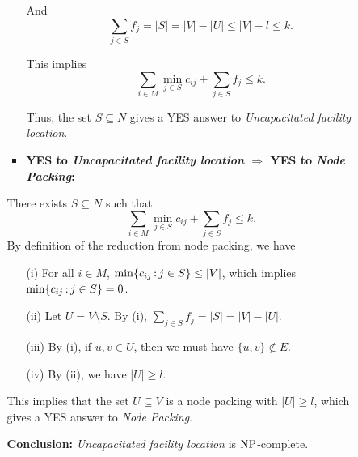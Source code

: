 \begin{enumerate}
\begin{enumerate}
\begin{itemize}
	And
	$$\sum_{j\in S}f_j=|S|=|V|-|U|\leq |V|-l\leq k.$$
	
	This implies $$\sum_{i\in M}\min_{j\in S} c_{ij} + \sum_{j\in S}f_j \leq k.$$
	
	Thus, the set $S\subseteq N$ gives a YES answer to {\em Uncapacitated facility location}. 
	
	\item {\bf YES to {\em Uncapacitated facility location} $\Rightarrow$ YES to  {\em Node Packing}:}



\end{itemize}
		


There exists $S\subseteq N$ such that
$$\sum_{i\in M}\min_{j\in S} c_{ij} + \sum_{j\in S}f_j \leq k.$$
By definition of the reduction from node packing, we have
\begin{itemize}
	\item[(i)] For all $i\in M$, $\min\{c_{ij}{\,:\,} j\in S\}\leq |V|$, which implies $\min\{c_{ij}{\,:\,} j\in S\}=0$.
	\item[(ii)] Let $U=V\setminus S$. By (i), $\sum_{j\in S}f_j=|S|=|V|-|U|$.
	\item[(iii)] By (i), if $u,v\in U$, then we must have $\{u,v\}\notin E$.
	\item[(iv)] By (ii), we have $|U|\geq l$. 
\end{itemize}

This implies that the set $U\subseteq V$ is a node packing with $|U|\geq l$, which gives a YES answer to  {\em Node Packing}.

{\bf Conclusion:}	{\em Uncapacitated facility location} is $\mbox{NP}$-complete.
\end{enumerate}
\end{enumerate}




%
%
%
